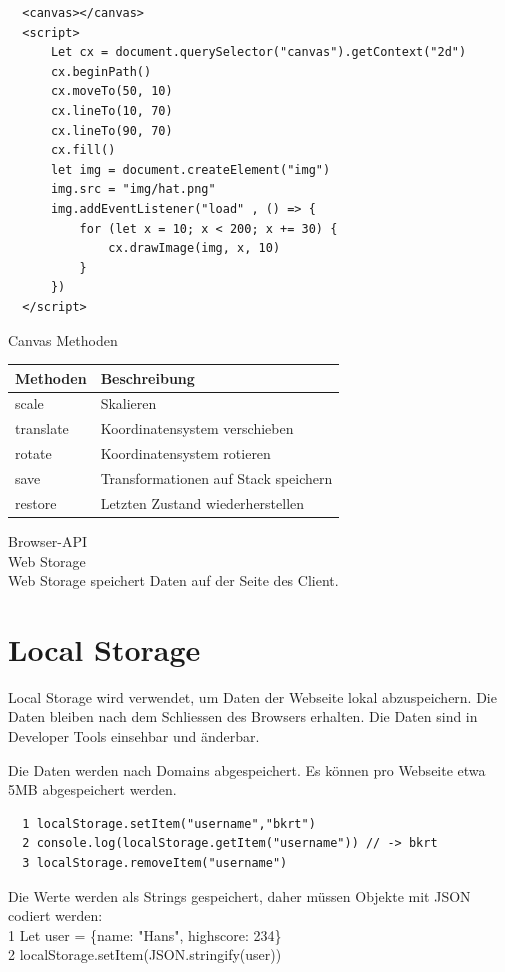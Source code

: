   \begin{verbatim}
  <canvas></canvas>
  <script>
      Let cx = document.querySelector("canvas").getContext("2d")
      cx.beginPath()
      cx.moveTo(50, 10)
      cx.lineTo(10, 70)
      cx.lineTo(90, 70)
      cx.fill()
      let img = document.createElement("img")
      img.src = "img/hat.png"
      img.addEventListener("load" , () => {
          for (let x = 10; x < 200; x += 30) {
              cx.drawImage(img, x, 10)
          }
      })
  </script>
  \end{verbatim}
  
  Canvas Methoden
  
  \begin{center}
  \begin{tabular}{|l|l|}
  \hline
  Methoden & Beschreibung \\
  \hline
  scale & Skalieren \\
  \hline
  translate & Koordinatensystem verschieben \\
  \hline
  rotate & Koordinatensystem rotieren \\
  \hline
  save & Transformationen auf Stack speichern \\
  \hline
  restore & Letzten Zustand wiederherstellen \\
  \hline
  \end{tabular}
  \end{center}
  
  Browser-API\\
  Web Storage\\
  Web Storage speichert Daten auf der Seite des Client.
  
  \section*{Local Storage}
  Local Storage wird verwendet, um Daten der Webseite lokal abzuspeichern. Die Daten bleiben nach dem Schliessen des Browsers erhalten. Die Daten sind in Developer Tools einsehbar und änderbar.
  
  Die Daten werden nach Domains abgespeichert. Es können pro Webseite etwa 5MB abgespeichert werden.
  
  \begin{verbatim}
  1 localStorage.setItem("username","bkrt")
  2 console.log(localStorage.getItem("username")) // -> bkrt
  3 localStorage.removeItem("username")
  \end{verbatim}
  
  Die Werte werden als Strings gespeichert, daher müssen Objekte mit JSON codiert werden:\\
  1 Let user = \{name: "Hans", highscore: 234\}\\
  2 localStorage.setItem(JSON.stringify(user))
  
